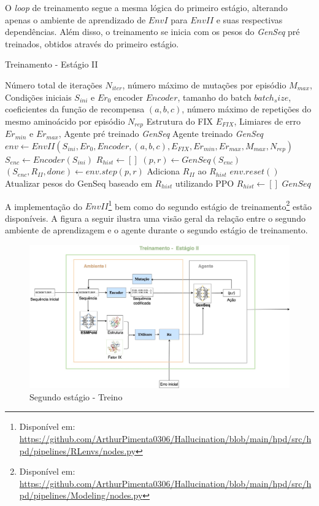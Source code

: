 O \textit{loop} de treinamento segue a mesma lógica do primeiro estágio, alterando apenas o ambiente de aprendizado de 
$EnvI$ para $EnvII$ e suas respectivas dependências. 
Além disso, o treinamento se inicia com os pesos do \textit{GenSeq} pré treinados, obtidos através do primeiro estágio. 

\begin{algorithm}[H]
  \caption{Treinamento - Estágio II}
  \label{alg:train_stage2}
  \begin{algorithmic}[1]
  \Require Número total de iterações $N_{iter}$, 
  \State         número máximo de mutações por episódio $M_{max}$, 
  \State         Condições iniciais $S_{ini}$ e $Er_{0}$
  \State         encoder $Encoder$,
  \State         tamanho do batch $batch_size$,
  \State         coeficientes da função de recompensa $(a, b, c)$,
  \State         número máximo de repetições do mesmo aminoácido por episódio $N_{rep}$
  \State         Estrutura do FIX $E_{FIX}$, 
  \State         Limiares de erro $Er_{min}$ e $Er_{max}$,
  \State         Agente pré treinado \textit{GenSeq}
  \Ensure Agente treinado \textit{GenSeq}
  \State $env \gets EnvII(S_{ini}, Er_{0}, Encoder, (a, b, c), E_{FIX}, Er_{min},Er_{max}, M_{max}, N_{rep})$ 
  \State $S_{enc} \gets Encoder(S_{ini})$ 
  \State $R_{hist} \gets []$ 
      \State $(p,r) \gets GenSeq(S_{enc})$ 
      \State $(S_{enc}, R_{II}, done) \gets env.step(p, r)$ 
      \State Adiciona $R_{II}$ ao $R_{hist}$ 
          \State $env.reset()$ 
      \EndIf
          \State Atualizar pesos do GenSeq baseado em $R_{hist}$ utilizando PPO
          \State $R_{hist} \gets []$
      \EndIf
  \EndFor
  \State \Return $GenSeq$
  \end{algorithmic}
\end{algorithm}

A implementação do $EnvII$\footnote{Disponível em: \url{https://github.com/ArthurPimenta0306/Hallucination/blob/main/hpd/src/hpd/pipelines/RLenvs/nodes.py}}
bem como do segundo estágio de treinamento\footnote{Disponível em: \url{https://github.com/ArthurPimenta0306/Hallucination/blob/main/hpd/src/hpd/pipelines/Modeling/nodes.py}}
estão disponíveis. 
A figura a seguir ilustra uma visão geral da relação entre o segundo ambiente de aprendizagem e o 
agente durante o segundo estágio de treinamento.

\begin{figure}[H]
  \centering
  \includegraphics[width=.8\textwidth]{figuras/metodologia-Training.jpg}
  \caption{Segundo estágio - Treino}
\end{figure}

